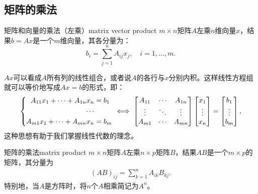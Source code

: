 \subsection{矩阵的乘法}

\begin{definition}
	{矩阵和向量的乘法（左乘）}{matrix vector product}
	$m \times n$矩阵$A$左乘$n$维向量$x$，结果$b = Ax$是一个$m$维向量，其各分量为：
	\begin{equation}
		b_i = \sum_{j=1}^nA_{ij}x_j,\quad i = 1,\ldots,m.
	\end{equation}
\end{definition}

\begin{remark}
	$Ax$可以看成$A$所有列的线性组合，或者说$A$的各行与$x$分别内积。这样线性方程组就可以等价地写成$Ax = b$的形式，即：
	\begin{equation}\label{eq:la-linear-system-matrix-form}
		\left\{\begin{aligned}
	        A_{11}x_1 + \cdots + A_{1n}x_n &= b_1\\
	        \cdots&\\
	        A_{m1}x_1 + \cdots + A_{mn}x_n &= b_m
	    \end{aligned}\right. \iff
	    \begin{bmatrix}
	        A_{11}&\cdots&A_{1n}\\
	        \vdots&\ddots&\vdots\\
	        A_{m1}&\cdots&A_{mn}
	    \end{bmatrix}
	    \begin{bmatrix}
	        x_1\\\vdots\\x_n
	    \end{bmatrix} =
	    \begin{bmatrix}
	        b_1\\\vdots\\b_m
	    \end{bmatrix},
	\end{equation}
	这种思想有助于我们掌握线性代数的理念。
\end{remark}

\begin{definition}{矩阵的乘法}{matrix product}
	$m \times n$矩阵$A$左乘$n \times p$矩阵$B$，结果$AB$是一个$m \times p$的矩阵，其分量为
	\begin{align}
		(AB)_{ij} = \sum_{k=1}^nA_{ik}B_{kj}.
	\end{align}
	特别地，当$A$是方阵时，将$n$个$A$相乘简记为$A^n$。
\end{definition}

